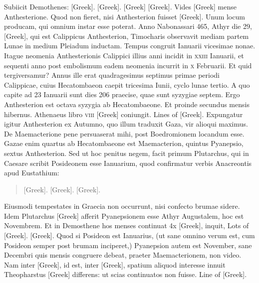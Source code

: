 Subiicit Demothenes: \textgreek{[Greek]}.
 \textgreek{[Greek]}. \textgreek{[Greek]}
\textgreek{[Greek]}.
Vides \textgreek{[Greek]}
mense Anthesterione.
Quod non fieret, nisi Anthesterion fuisset \textgreek{[Greek]}.
Unum locum producam, qui omnium instar esse poterat.
Anno
Nabonassari 465, Athyr die 29, \textgreek{[Greek]}, qui est Calippicus
Anthesterion, Timocharis observavit mediam partem Lunae in
medium Pleiadum inductam.
Tempus congruit Ianuarii vicesimae
nonae.
Itague neomenia Anthesterionis Calippici illius anni incidit in
\textsc{xxiii} Ianuarii, et sequenti anno post embolismum eadem
 neomenia incurrit
in \textsc{x} Februarii.
Et quid tergiversamur?
Annus ille erat quadragesimus
septimus primae periodi Calippicae, cuius Hecatombaeon caepit
tricesima Iunii, cyclo lunae tertio.
A quo capite ad 23 Ianuarii sunt dies
206 praecise, quae sunt syzygiae septem.
Ergo Anthesterion est octava
syzygia ab Hecatombaeone.
Et proinde secundus mensis hibernus.
Athenaeus
libro \textsc{viii} \textgreek{[Greek]} coniungit.
\textgreek{Lines of [Greek]}.
Expungatur igitur Anthesterion ex Autumno, quo
illum traduxit Gaza, vir alioqui maximus.
De Maemacterione pene
persuaserat mihi, post Boedromionem locandum esse.
Gazae enim
quartus ab Hecatombaeone est Maemacterion, quintus Pyanepsio, sextus
Anthesterion.
Sed ut hoc penitus negem, facit primum Plutarchus,
qui in Caesare scribit Posideonem esse Ianuarium, quod confirmatur
verbis Anacreontis apud Eustathium:
\begin{quote}
  \textgreek{[Greek]}.
  \textgreek{[Greek]}.
  \textgreek{[Greek]}.
\end{quote}
Eiusmodi tempestates in Graecia non occurrunt, nisi confecto brumae
sidere.
Idem Plutarchus \textgreek{[Greek]} afferit Pyanepsionem esse Athyr
Augustalem, hoc est Novembrem.
Et in Demosthene hos menses
continuat \textgreek{4x [Greek]}, inquit, \textgreek{Lots of [Greek]}.
\textgreek{[Greek]}.
Quod si Posideon est Ianuarius, (ut sane omnino verum est, cum Posideon
semper post brumam inciperet,) Pyanepsion autem est November,
sane Decembri quis mensis congruere debeat, praeter Maemacterionem,
non video.
Nam inter \textgreek{[Greek]}, id est, inter
\textgreek{[Greek]}, spatium aliquod interesse innuit Theopharstus
\textgreek{[Greek]} differens: ut scias continuatos non fuisse.
\textgreek{Line of [Greek]}.

